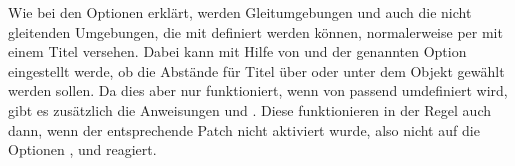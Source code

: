 \begin{Declaration}
\end{Declaration}%
Wie bei den Optionen  erklärt,
werden Gleitumgebungen und auch die nicht gleitenden Umgebungen, die mit
 definiert werden können, normalerweise
per  mit einem Titel versehen. Dabei kann mit Hilfe von
 und der genannten Option eingestellt werde, ob die Abstände
für Titel über oder unter dem Objekt gewählt werden sollen. Da dies aber nur
funktioniert, wenn  von  passend umdefiniert
wird, gibt es zusätzlich die Anweisungen  und
. Diese funktionieren in der Regel auch dann, wenn der
entsprechende Patch nicht aktiviert wurde, also  nicht auf die
Optionen ,
 und
 reagiert.
%
